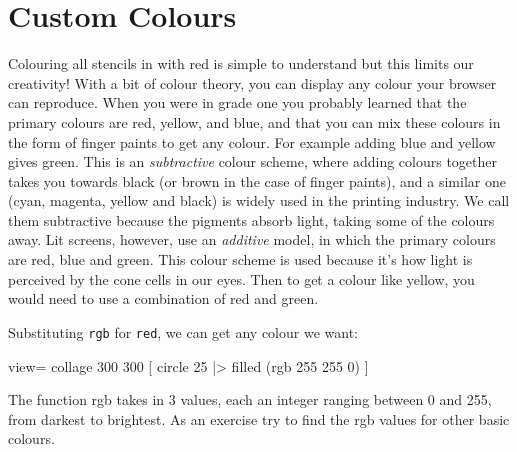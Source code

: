\documentclass[12pt]{amsbook}
\begin{document}
\section{Custom Colours}

Colouring all stencils in with red is simple to understand but this limits our creativity! 
With a bit of colour theory, you can display any colour your browser can reproduce.
When you were in grade one you probably learned that the primary colours are red, yellow, and blue, and that you can mix these colours in the form of finger paints to get any colour. 
For example adding blue and yellow gives green.
This is an \textit{subtractive} colour scheme, where adding colours together takes you towards black (or brown in the case of finger paints), and a similar one (cyan, magenta, yellow and black) is widely used in the printing industry.
We call them subtractive because the pigments absorb light, taking some of the colours away.
Lit screens, however, use an \textit{additive} model, in which the primary colours are red, blue and green. This colour scheme is used because it's how light is perceived by the cone cells in our eyes. Then to get a colour like yellow, you would need to use a combination of red and green.  

Substituting \verb|rgb| for \verb|red|, we can get any colour we want:
\begin{code}
view= collage 300 300 [
						circle 25
							|> filled (rgb 255 255 0) 
					  ]
\end{code}
The function rgb takes in 3 values, each an integer ranging between 0 and 255, from darkest to brightest. As an exercise try to find the rgb values for other basic colours. 
\end{document}
